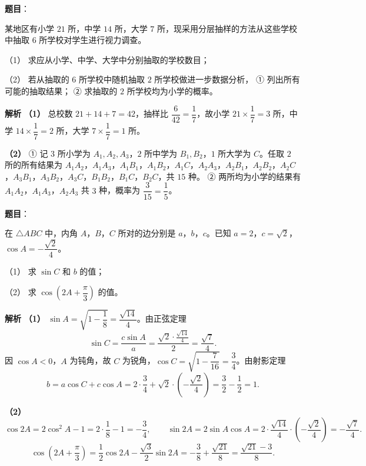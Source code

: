 \begin{answer}

\textbf{题目}：

某地区有小学 $21$ 所，中学 $14$ 所，大学 $7$ 所，现采用分层抽样的方法从这些学校中抽取 $6$ 所学校对学生进行视力调查。

（1） 求应从小学、中学、大学中分别抽取的学校数目；

（2） 若从抽取的 $6$ 所学校中随机抽取 $2$ 所学校做进一步数据分析，
① 列出所有可能的抽取结果；
② 求抽取的 $2$ 所学校均为小学的概率。

\textbf{解析}
\textbf{（1）} 总校数 $21+14+7=42$，抽样比 $\dfrac6{42}=\dfrac17$，故小学 $21\times\dfrac17=3$ 所，中学 $14\times\dfrac17=2$ 所，大学 $7\times\dfrac17=1$ 所。

\textbf{（2）} ① 记 $3$ 所小学为 $A_1,A_2,A_3$，$2$ 所中学为 $B_1,B_2$，$1$ 所大学为 $C$。任取 $2$ 所的所有结果为
$A_1A_2$，$A_1A_3$，$A_1B_1$，$A_1B_2$，$A_1C$，$A_2A_3$，$A_2B_1$，$A_2B_2$，$A_2C$，$A_3B_1$，$A_3B_2$，$A_3C$，$B_1B_2$，$B_1C$，$B_2C$，共 $15$ 种。
② 两所均为小学的结果有 $A_1A_2$，$A_1A_3$，$A_2A_3$ 共 $3$ 种，概率为 $\dfrac3{15}=\dfrac15$。



\end{answer}
\begin{answer}

\textbf{题目}：

在 $\triangle ABC$ 中，内角 $A$，$B$，$C$ 所对的边分别是 $a$，$b$，$c$。已知 $a=2$，$c=\sqrt2$，$\cos A=-\dfrac{\sqrt2}4$。

（1） 求 $\sin C$ 和 $b$ 的值；

（2） 求 $\cos\left(2A+\dfrac\pi3\right)$ 的值。

\textbf{解析}
\textbf{（1）} $\sin A=\sqrt{1-\dfrac18}=\dfrac{\sqrt{14}}4$。由正弦定理
\nopagebreak[4]
\[\sin C=\frac{c\sin A}a=\frac{\sqrt2\cdot\frac{\sqrt{14}}4}2=\frac{\sqrt7}4.\]
因 $\cos A<0$，$A$ 为钝角，故 $C$ 为锐角，$\cos C=\sqrt{1-\dfrac7{16}}=\dfrac34$。由射影定理
\nopagebreak[4]
\[b=a\cos C+c\cos A=2\cdot\frac34+\sqrt2\cdot\left(-\frac{\sqrt2}4\right)=\frac32-\frac12=1.\]

\textbf{（2）}
\nopagebreak[4]
\[\cos2A=2\cos^2A-1=2\cdot\frac18-1=-\frac34,\qquad \sin2A=2\sin A\cos A=2\cdot\frac{\sqrt{14}}4\cdot\left(-\frac{\sqrt2}4\right)=-\frac{\sqrt7}4.\]
\nopagebreak[4]
\[\cos\left(2A+\frac\pi3\right)=\frac12\cos2A-\frac{\sqrt3}2\sin2A=-\frac38+\frac{\sqrt{21}}8=\frac{\sqrt{21}-3}8.\]



\end{answer}
